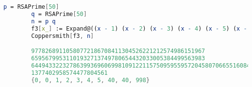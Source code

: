     	\begin{lstlisting}[language=Mathematica,caption={
      		Пример	3
    	}]
		p = RSAPrime[50]
		q = RSAPrime[50]
		n = p q
		f3[x_] := Expand@((x - 1) (x - 2) (x - 3) (x - 4) (x - 5) (x - 40) (x - 40) (x - 998) x)
		Coppersmith[f3, n]

		97782689110580772186708411304526221212574986151967
		65956799531101932713749780654432033005384499563983
		644943322327863993696069981091221157509595595720458070665516084380384623599211\
		1377402958574477804561
		{0, 0, 1, 2, 3, 4, 5, 40, 40, 998}
    	\end{lstlisting}

